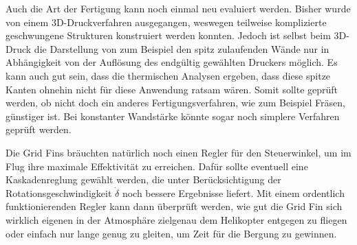 Auch die Art der Fertigung kann noch einmal neu evaluiert werden. Bisher wurde von einem 3D-Druckverfahren ausgegangen, weswegen teilweise komplizierte geschwungene Strukturen konstruiert werden konnten. Jedoch ist selbst beim 3D-Druck die Darstellung von zum Beispiel den spitz zulaufenden Wände nur in Abhängigkeit von der Auflösung des endgültig gewählten Druckers möglich. Es kann auch gut sein, dass die thermischen Analysen ergeben, dass diese spitze Kanten ohnehin nicht für diese Anwendung ratsam wären. Somit sollte geprüft werden, ob nicht doch ein anderes Fertigungsverfahren, wie zum Beispiel Fräsen, günstiger ist. Bei konstanter Wandstärke könnte sogar noch simplere Verfahren geprüft werden.

Die Grid Fins bräuchten natürlich noch einen Regler für den Steuerwinkel, um im Flug ihre maximale Effektivität zu erreichen. Dafür sollte eventuell eine Kaskadenreglung gewählt werden, die unter Berücksichtigung der Rotationsgeschwindigkeit $\dot{\delta}$ noch bessere Ergebnisse liefert. Mit einem ordentlich funktionierenden Regler kann dann überprüft werden, wie gut die Grid Fin sich wirklich eigenen in der Atmosphäre zielgenau dem Helikopter entgegen zu fliegen oder einfach nur lange genug zu gleiten, um Zeit für die Bergung zu gewinnen.